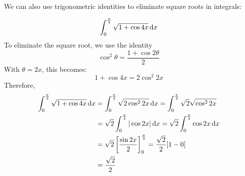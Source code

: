 We can also use trigonometric identities to eliminate square roots in integrals:
\begin{ex}
  \[ \int^{\frac{\pi}{4}}_{0} \sqrt{1+\cos{4x}}\,\mathrm{d} x \]
  To eliminate the square root, we use the identity
  \[ \cos^2 \theta = \frac{1+\cos{2 \theta}}{2} \]
  With $\theta=2x$, this becomes:
  \[ 1+\cos{4x}=2\cos^2{2x} \]
  Therefore,
  \begin{align*}
    \int^{\frac{\pi}{4}}_{0} \sqrt{1+\cos{4x}}\,\mathrm{d} x&= \int^{\frac{\pi}{4}}_{0} \sqrt{2 \cos^2{2x}} \,\mathrm{d} x = \int^{\frac{\pi}{4}}_{0} \sqrt2 \sqrt{\cos^2{2x}} \\
    &= \sqrt2 \int^{\frac{\pi}{4}}_{0} |\cos{2x}|\,\mathrm{d} x = \sqrt2 \int^{\frac{\pi}{4}}_{0} \cos{2x}\,\mathrm{d} x \\
    &= \sqrt2 \left[\frac{\sin{2x}}{2}\right]^{\frac{\pi}{4}}_{0} = \frac{\sqrt2}{2}[1-0] \\
    &= \frac{\sqrt2}{2}
  \end{align*}
\end{ex}

